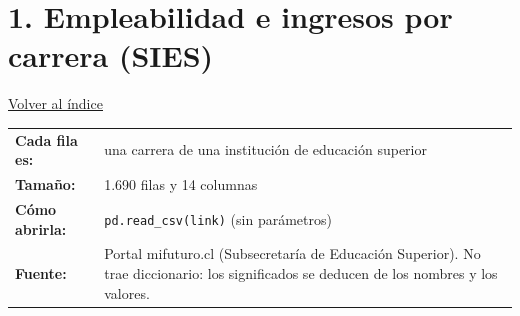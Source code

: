 \documentclass[10.5pt]{article}
\begin{document}
\section*{1. Empleabilidad e ingresos por carrera (SIES)}
\vspace{-6pt}\hfill{\small\hyperlink{indice}{\textcolor{azuloscuro}{\underline{Volver al índice}}}}\par\vspace{2pt}
\begin{tabularx}{\linewidth}{@{}l X@{}}\textbf{Cada fila es:} & una carrera de una institución de educación superior \\\textbf{Tamaño:} & 1.690 filas y 14 columnas \\\textbf{Cómo abrirla:} & \texttt{pd.read\_\allowbreak{}csv(link)} (sin parámetros) \\\textbf{Fuente:} & Portal mifuturo.cl (Subsecretaría de Educación Superior). No trae diccionario: los significados se deducen de los nombres y los valores. \\\end{tabularx}
\vspace{6pt}
\end{document}
